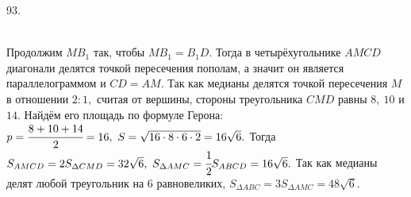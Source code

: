 93. \begin{figure}[ht!]
\end{figure}\\
Продолжим $MB_1$ так, чтобы $MB_1=B_1D.$ Тогда в четырёхугольнике $AMCD$ диагонали делятся точкой пересечения пополам, а значит он является параллелограммом и $CD=AM.$ Так как медианы делятся точкой пересечения $M$ в отношении $2:1,$ считая от вершины, стороны треугольника $CMD$ равны $8,\ 10$ и $14.$ Найдём его площадь по формуле Герона: $p=\cfrac{8+10+14}{2}=16,\ S=\sqrt{16\cdot8\cdot6\cdot2}=16\sqrt{6}.$ Тогда $S_{AMCD}=2S_{\Delta CMD}=32\sqrt{6},\ S_{\Delta AMC}=\cfrac{1}{2}S_{ABCD}=16\sqrt{6}.$ Так как медианы делят любой треугольник на 6 равновеликих, $S_{\Delta ABC}=3S_{\Delta AMC}=48\sqrt{6}.$\newpage\noindent
